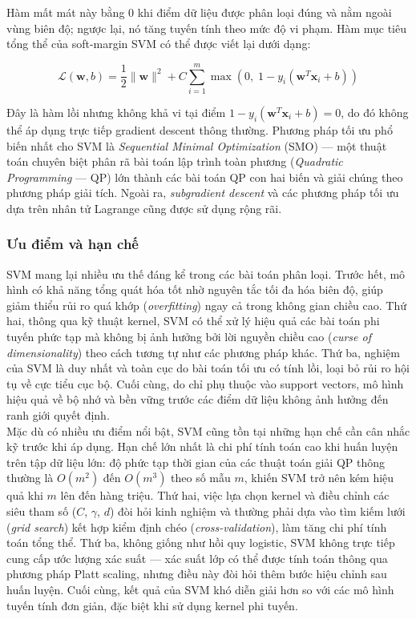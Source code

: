 \noindent Hàm mất mát này bằng $0$ khi điểm dữ liệu được phân loại đúng và nằm ngoài vùng biên độ; ngược lại, nó tăng tuyến tính theo mức độ vi phạm. Hàm mục tiêu tổng thể của soft-margin SVM có thể được viết lại dưới dạng:

\begin{equation}
  \mathcal{L}(\mathbf{w}, b)
  = \frac{1}{2}\|\mathbf{w}\|^2
  + C \sum_{i=1}^{m} \max\!\left(0,\;
    1 - y_i\!\left(\mathbf{w}^T \mathbf{x}_i + b\right)\right)
  \label{eq:total_loss}
\end{equation}

\noindent Đây là hàm lồi nhưng không khả vi tại điểm $1 - y_i(\mathbf{w}^T \mathbf{x}_i + b) = 0$, do đó không thể áp dụng trực tiếp gradient descent thông thường. Phương pháp tối ưu phổ biến nhất cho SVM là \textit{Sequential Minimal Optimization} (SMO) --- một thuật toán chuyên biệt phân rã bài toán lập trình toàn phương (\textit{Quadratic Programming} --- QP) lớn thành các bài toán QP con hai biến và giải chúng theo phương pháp giải tích. Ngoài ra, \textit{subgradient descent} và các phương pháp tối ưu dựa trên nhân tử Lagrange cũng được sử dụng rộng rãi.

\subsubsection{Ưu điểm và hạn chế}

SVM mang lại nhiều ưu thế đáng kể trong các bài toán phân loại. Trước hết, mô hình có khả năng tổng quát hóa tốt nhờ nguyên tắc tối đa hóa biên độ, giúp giảm thiểu rủi ro quá khớp (\textit{overfitting}) ngay cả trong không gian chiều cao. Thứ hai, thông qua kỹ thuật kernel, SVM có thể xử lý hiệu quả các bài toán phi tuyến phức tạp mà không bị ảnh hưởng bởi lời nguyền chiều cao (\textit{curse of dimensionality}) theo cách tương tự như các phương pháp khác. Thứ ba, nghiệm của SVM là duy nhất và toàn cục do bài toán tối ưu có tính lồi, loại bỏ rủi ro hội tụ về cực tiểu cục bộ. Cuối cùng, do chỉ phụ thuộc vào support vectors, mô hình hiệu quả về bộ nhớ và bền vững trước các điểm dữ liệu không ảnh hưởng đến ranh giới quyết định.\\

Mặc dù có nhiều ưu điểm nổi bật, SVM cũng tồn tại những hạn chế cần cân nhắc kỹ trước khi áp dụng. Hạn chế lớn nhất là chi phí tính toán cao khi huấn luyện trên tập dữ liệu lớn: độ phức tạp thời gian của các thuật toán giải QP thông thường là $O(m^2)$ đến $O(m^3)$ theo số mẫu $m$, khiến SVM trở nên kém hiệu quả khi $m$ lên đến hàng triệu. Thứ hai, việc lựa chọn kernel và điều chỉnh các siêu tham số ($C$, $\gamma$, $d$) đòi hỏi kinh nghiệm và thường phải dựa vào tìm kiếm lưới (\textit{grid search}) kết hợp kiểm định chéo (\textit{cross-validation}), làm tăng chi phí tính toán tổng thể. Thứ ba, không giống như hồi quy logistic, SVM không trực tiếp cung cấp ước lượng xác suất --- xác suất lớp có thể được tính toán thông qua phương pháp Platt scaling, nhưng điều này đòi hỏi thêm bước hiệu chỉnh sau huấn luyện. Cuối cùng, kết quả của SVM khó diễn giải hơn so với các mô hình tuyến tính đơn giản, đặc biệt khi sử dụng kernel phi tuyến.

